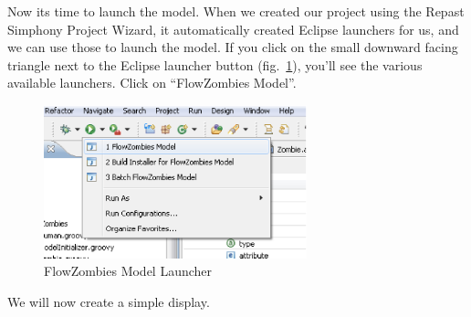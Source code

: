 \documentclass[11pt]{amsart}
\begin{document}
Now its time to launch the model. When we created our project using the Repast Simphony Project Wizard, it automatically created Eclipse launchers for us, and we can use those to launch the model. If you click on the small downward facing triangle next to the Eclipse launcher button (fig.~\ref{fig:launch}), you'll see the various available launchers. Click on ``FlowZombies Model''.

\begin{figure}[h]
\begin{center}
\vspace{.2in}
\centerline {
\includegraphics[width=3in]{figs/launcher.eps}
}
\caption{FlowZombies Model Launcher}
\label{fig:launch}
\end{center}
\end{figure}

We will now create a simple display. 
\end{document}

